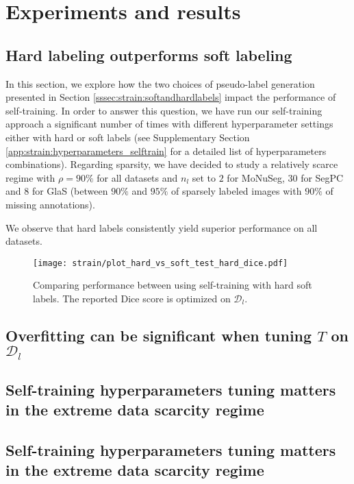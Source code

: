\section{Experiments and results}
\label{sec:strain:results}

\subsection{Hard labeling outperforms soft labeling}

In this section, we explore how the two choices of pseudo-label generation presented in Section \ref{sssec:strain:softandhardlabels} impact the performance of self-training. In order to answer this question, we have run our self-training approach a significant number of times with different hyperparameter settings either with hard or soft labels (see Supplementary Section \ref{app:strain:hyperparameters_selftrain} for a detailed list of hyperparameters combinations). Regarding sparsity, we have decided to study a relatively scarce regime with $\rho = 90\%$ for all datasets and $n_l$ set to $2$ for MoNuSeg, $30$ for SegPC and $8$ for GlaS (\ie between $90\%$ and $95\%$ of sparsely labeled images with $90\%$ of missing annotations).    

We observe that hard labels consistently yield superior performance on all datasets. 

\begin{figure}
  \centering
  \texttt{[image: strain/plot\_hard\_vs\_soft\_test\_hard\_dice.pdf]}
  \caption{Comparing performance between using self-training with hard \vs soft labels. The reported Dice score is optimized on $\mathcal{D}_l$.}
  \label{fig:strain:hard_vs_soft}
\end{figure}

\subsection{Overfitting can be significant when tuning $T$ on $\mathcal{D}_l$}

\subsection{Self-training hyperparameters tuning matters in the extreme data scarcity regime}

\subsection{Self-training hyperparameters tuning matters in the extreme data scarcity regime}


